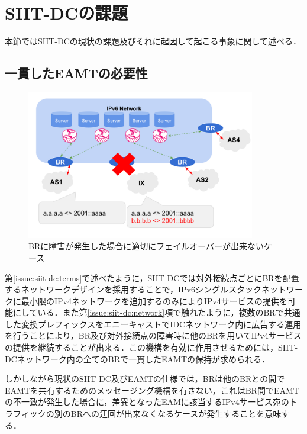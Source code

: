 \section{SIIT-DCの課題}
\label{issue:siit-dc_problems}
本節ではSIIT-DCの現状の課題及びそれに起因して起こる事象に関して述べる．

\subsection{一貫したEAMTの必要性}
\label{issue:siit-dc_problems:consistent}

\begin{figure}[h]
    \begin{center}
      \includegraphics[width=10cm,pagebox=cropbox,clip]{img/siit-dc_can-not-failover.png}
    \end{center}
    \caption{BRに障害が発生した場合に適切にフェイルオーバーが出来ないケース}
    \label{fig:siit-dc_can-not-failover}
\end{figure}

第\ref{issue:siit-dc:terms}で述べたように，SIIT-DCでは対外接続点ごとにBRを配置するネットワークデザインを採用することで，IPv6シングルスタックネットワークに最小限のIPv4ネットワークを追加するのみによりIPv4サービスの提供を可能にしている．また第\ref{issue:siit-dc:network}項で触れたように，複数のBRで共通した変換プレフィックスをエニーキャストでIDCネットワーク内に広告する運用を行うことにより，BR及び対外接続点の障害時に他のBRを用いてIPv4サービスの提供を継続することが出来る．この機構を有効に作用させるためには，SIIT-DCネットワーク内の全てのBRで一貫したEAMTの保持が求められる．

しかしながら現状のSIIT-DC及びEAMTの仕様\cite{RFC7755,RFC7756,RFC7757}では，BRは他のBRとの間でEAMTを共有するためのメッセージング機構を有さない，これはBR間でEAMTの不一致が発生した場合に，差異となったEAMに該当するIPv4サービス宛のトラフィックの別のBRへの迂回が出来なくなるケースが発生することを意味する．


